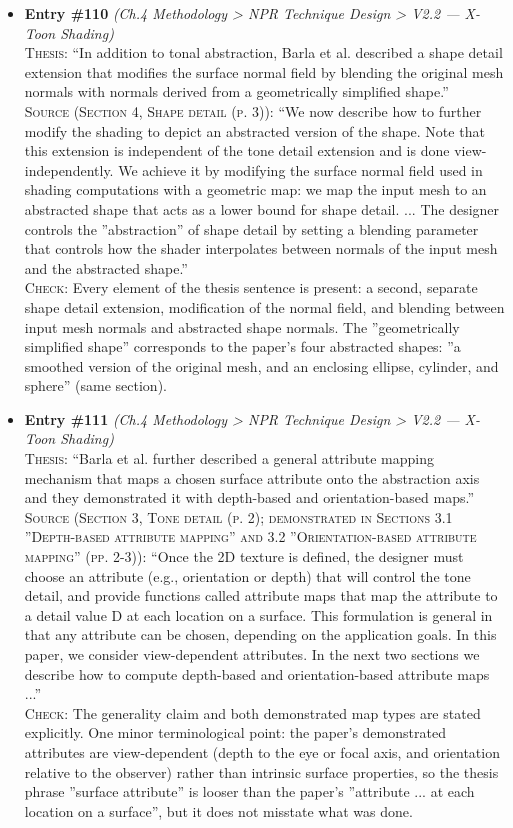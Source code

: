 \documentclass[11pt, a4paper]{article}
\begin{document}
\begin{itemize}[leftmargin=1.2em,itemsep=4pt]
\item \textbf{Entry \#110} \textit{(Ch.4 Methodology > NPR Technique Design > V2.2 — X-Toon Shading)}\\
\textsc{Thesis:} ``In addition to tonal abstraction, Barla et al. described a shape detail extension that modifies the surface normal field by blending the original mesh normals with normals derived from a geometrically simplified shape.''\\
\textsc{Source (Section 4, Shape detail (p. 3)):} ``We now describe how to further modify the shading to depict an abstracted version of the shape. Note that this extension is independent of the tone detail extension and is done view-independently. We achieve it by modifying the surface normal field used in shading computations with a geometric map: we map the input mesh to an abstracted shape that acts as a lower bound for shape detail. ... The designer controls the ”abstraction” of shape detail by setting a blending parameter that controls how the shader interpolates between normals of the input mesh and the abstracted shape.''\\
\textsc{Check:} Every element of the thesis sentence is present: a second, separate shape detail extension, modification of the normal field, and blending between input mesh normals and abstracted shape normals. The ”geometrically simplified shape” corresponds to the paper's four abstracted shapes: ”a smoothed version of the original mesh, and an enclosing ellipse, cylinder, and sphere” (same section).
\item \textbf{Entry \#111} \textit{(Ch.4 Methodology > NPR Technique Design > V2.2 — X-Toon Shading)}\\
\textsc{Thesis:} ``Barla et al. further described a general attribute mapping mechanism that maps a chosen surface attribute onto the abstraction axis and they demonstrated it with depth-based and orientation-based maps.''\\
\textsc{Source (Section 3, Tone detail (p. 2); demonstrated in Sections 3.1 ”Depth-based attribute mapping” and 3.2 ”Orientation-based attribute mapping” (pp. 2-3)):} ``Once the 2D texture is defined, the designer must choose an attribute (e.g., orientation or depth) that will control the tone detail, and provide functions called attribute maps that map the attribute to a detail value D at each location on a surface. This formulation is general in that any attribute can be chosen, depending on the application goals. In this paper, we consider view-dependent attributes. In the next two sections we describe how to compute depth-based and orientation-based attribute maps ...''\\
\textsc{Check:} The generality claim and both demonstrated map types are stated explicitly. One minor terminological point: the paper's demonstrated attributes are view-dependent (depth to the eye or focal axis, and orientation relative to the observer) rather than intrinsic surface properties, so the thesis phrase ”surface attribute” is looser than the paper's ”attribute ... at each location on a surface”, but it does not misstate what was done.
\end{itemize}
\end{document}

